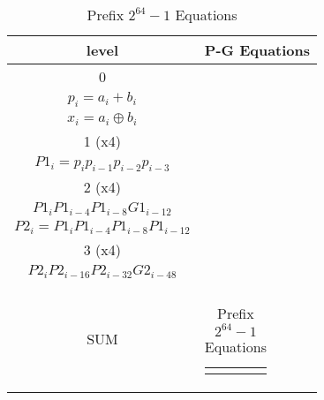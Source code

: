 \begin{table}[H]
\centering
     \begin{tabularx}{\textwidth}{ || c | X || } 

        \hline
        level & P-G Equations\\
        \hline
        \hline
 
        0   & 
        \begin{tabular}{@{}c@{}}
        $g_i = a_i * b_i$\\
        $p_i = a_i + b_i$\\
        $x_i = a_i \oplus b_i $
        \end{tabular}\\\hline

        1 (x4)  & 
        \begin{tabular}{@{}c@{}}
        $G1_i = g_i + p_ig_{i-1} + p_ip_{i-1}g_{i-1} + p_ip_{i-1}p_{i-2}g_{i-1}$\\
        $P1_i = p_i p_{i-1} p_{i-2} p_{i-3}$
        \end{tabular}\\\hline

        2 (x4)  & 
        \begin{tabular}{@{}c@{}}
        $G2_i = G1_i + P1_{i}G1_{i-4} + P1_{i}P1_{i-4}G1_{i-8} +$ \\ $P1_{i}P1_{i-4}P1_{i-8}G1_{i-12}$\\
        $P2_i = P1_{i}P1_{i-4}P1_{i-8}P1_{i-12}$
        \end{tabular}\\\hline
        
        3 (x4)  & 
        \begin{tabular}{@{}c@{}}
        $G3_i = G2_i + P2_{i}G2_{i-16} + P2_{i}P2_{i-16}G2_{i-32} +$ \\ $P2_{i}P2_{i-16}P2_{i-32}G2_{i-48}$\\
        \end{tabular}\\\hline
        
        SUM   & 
        \begin{tabular}{@{}c@{}}
        $ sum_i = G_{i-1} \oplus x_i$
        \end{tabular}\\\hline

    \end{tabularx}
\caption{Prefix $2^{64}-1$ Equations}
\end{table}











